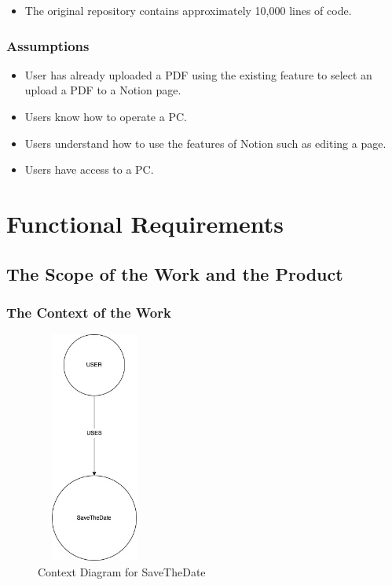 \documentclass[12pt, titlepage]{article}
\begin{document}
\begin{itemize}
\item The original repository contains approximately 10,000 lines of code. 
\end{itemize}

\subsubsection{Assumptions}

\begin{itemize}
\item User has already uploaded a PDF using the existing feature to select an upload a PDF to a Notion page. 
\item Users know how to operate a PC.
\item Users understand how to use the features of Notion such as editing a page.
\item Users have access to a PC.
\end{itemize}

\pagebreak

\section{Functional Requirements}

\subsection{The Scope of the Work and the Product}

\subsubsection{The Context of the Work}

  \begin{figure}
    \centerline{\includegraphics[width=1.5in, height=3in]{images/context_diagram.jpg}}
    \caption{Context Diagram for SaveTheDate}
  \end{figure}
\end{document}
